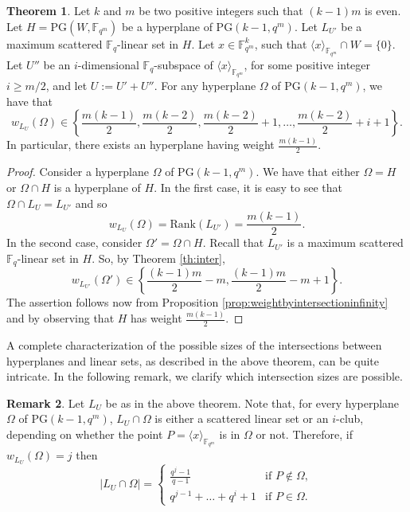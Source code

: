 \documentclass[11pt]{amsart}
\theoremstyle{definition}
\newtheorem{theorem}{Theorem}[section]
\newtheorem{remark}[theorem]{Remark}
\newcommand{\F}{{\mathbb F}}
\newcommand{\fq}{{\mathbb F}_{q}}
\newcommand{\la}{\langle}
\newcommand{\ra}{\rangle}
\newcommand{\PG}{\mathrm{PG}}
\newcommand{\fqm}{\mathbb{F}_{q^m}}
\begin{document}
\begin{theorem}\label{th:coneconstruct}
Let $k$ and $m$ be two positive integers such that $(k-1)m$ is even.
Let $H=\PG(W,\fqm)$ be a hyperplane of $\mathrm{PG}(k-1,q^m)$. Let $L_{U'}$ be a maximum scattered $\fq$-linear set in $H$.
Let $x\in \mathbb{F}_{q^m}^k$, such that $\langle x\rangle_{\mathbb{F}_{q^m}}\cap  W= \{0\}$. Let $U''$ be an $i$-dimensional $\fq$-subspace of $\langle x\rangle_{\mathbb{F}_{q^m}}$, for some positive integer $i\geq m/2$, and let $U:=U'+U''$.
For any hyperplane $\Omega$ of $\mathrm{PG}(k-1,q^m)$, we have that
\[ w_{L_U}(\Omega)\in \left\{ \frac{m(k-1)}2,\frac{m(k-2)}2, \frac{m(k-2)}2+1,\ldots, \frac{m(k-2)}2+i+1 \right\}. \]
In particular, there exists an hyperplane having weight $\frac{m(k-1)}2$.
\end{theorem}
\begin{proof}
Consider a hyperplane $\Omega$ of $\mathrm{PG}(k-1,q^m)$.
We have that either $\Omega=H$ or $\Omega \cap H$ is a hyperplane of $H$.
In the first case, it is easy to see that $\Omega \cap L_{U}=L_{U'}$ and so \[w_{L_U}(\Omega)=\mathrm{Rank}(L_{U'})=\frac{m(k-1)}2.\]
In the second case, consider $\Omega'=\Omega \cap H$. Recall that $L_{U'}$ is a maximum scattered $\F_q$-linear set in $H$. So, by Theorem \ref{th:inter}, \[w_{L_{U'}}(\Omega') \in \left\{  \frac{(k-1)m}{2}-m,  \frac{(k-1)m}{2}-m+1\right\}.\]
The assertion follows now from Proposition \ref{prop:weightbyintersectioninfinity} and by observing that $H$ has weight $\frac{m(k-1)}2$.
\end{proof}

A complete characterization of the possible sizes of the intersections between hyperplanes and linear sets, as described in the above theorem, can be quite intricate. In the following remark, we clarify which intersection sizes are possible.

\begin{remark}
    Let $L_U$ be as in the above theorem.
    Note that, for every hyperplane $\Omega$ of $\mathrm{PG}(k-1,q^m)$, $L_U\cap \Omega$ is either a scattered linear set or an $i$-club, depending on whether the point $P=\la x \ra_{\fqm}$ is in $\Omega$ or not. Therefore, if $w_{L_{U}}(\Omega)=j$ then
    \[|L_U \cap \Omega|= \begin{cases}
        \frac{q^j-1}{q-1} & \text{if } P \notin \Omega,\\
        q^{j-1}+\ldots+q^i+1  & \text{if } P \in \Omega.
    \end{cases}\]
\end{remark}
\end{document}
